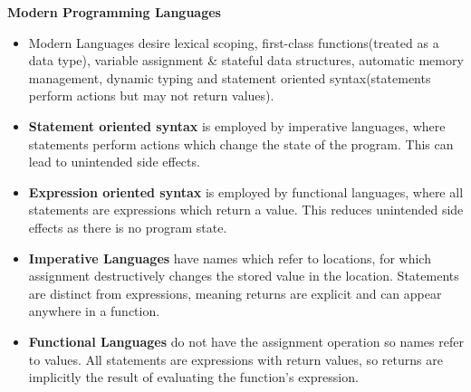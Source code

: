 \begin{center}
     \textbf{Modern Programming Languages}
\end{center}
\begin{itemize}
    \item Modern Languages desire lexical scoping, first-class functions(treated as a data type), variable assignment \& stateful data structures, automatic memory management, dynamic typing and statement oriented syntax(statements perform actions but may not return values).
    \item \textbf{Statement oriented syntax} is employed by imperative languages, where statements perform actions which change the state of the program. This can lead to unintended side effects.
    \item \textbf{Expression oriented syntax} is employed by functional languages, where all statements are expressions which return a value. This reduces unintended side effects as there is no program state.
    \item \textbf{Imperative Languages} have names which refer to locations, for which assignment destructively changes the stored value in the location. Statements are distinct from expressions, meaning returns are explicit and can appear anywhere in a function.
    \item \textbf{Functional Languages} do not have the assignment operation so names refer to values. All statements are expressions with return values, so returns are implicitly the result of evaluating the function's expression.
\end{itemize}

